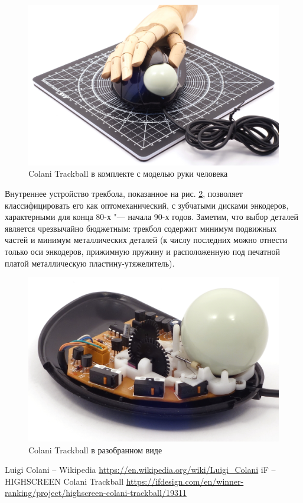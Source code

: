 \documentclass[11pt, a4paper]{article}
\begin{document}
\begin{figure}[h]
    \centering
    \includegraphics[scale=0.15]{1993_colani_trackball/hand_60.jpg}
    \caption{Colani Trackball в комплекте с моделью руки человека}
    \label{fig:ColaniHand}
\end{figure}

Внутреннее устройство трекбола, показанное на рис. \ref{fig:ColaniInside}, позволяет классифицировать его как оптомеханический, с зубчатыми дисками энкодеров, характерными для конца 80-х "--- начала 90-х годов. Заметим, что выбор деталей является чрезвычайно бюджетным: трекбол содержит минимум подвижных частей и минимум металлических деталей (к числу последних можно отнести только оси энкодеров, прижимную пружину и расположенную под печатной платой металлическую пластину-утяжелитель).

\begin{figure}[h]
    \centering
    \includegraphics[scale=0.8]{1993_colani_trackball/inside_30.jpg}
    \caption{Colani Trackball в разобранном виде}
    \label{fig:ColaniInside}
\end{figure}

\begin{thebibliography}{9}
     Luigi Colani – Wikipedia \url{https://en.wikipedia.org/wiki/Luigi_Colani}
     iF – HIGHSCREEN Colani Trackball \url{https://ifdesign.com/en/winner-ranking/project/highscreen-colani-trackball/19311}
\end{thebibliography}
\end{document}
